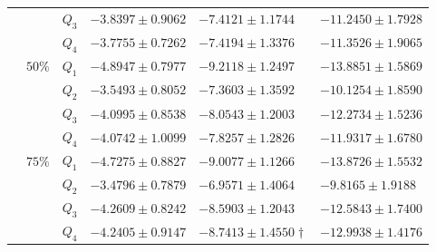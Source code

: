 \begin{table}[h]
{\begin{tabular}{@{}ccclll@{}}
 &  & $Q_{3}$ & $-3.8397 \pm 0.9062$ & $-7.4121 \pm 1.1744$ & $-11.2450 \pm 1.7928$ \\
 &  & $Q_{4}$ & $-3.7755 \pm 0.7262$ & $-7.4194 \pm 1.3376$ & $-11.3526 \pm 1.9065$ \\ \cmidrule(l){2-6} 
 & $50\%$ & $Q_{1}$ & $-4.8947 \pm 0.7977$ & $-9.2118 \pm 1.2497$ & $-13.8851 \pm 1.5869$ \\
 &  & $Q_{2}$ & $\mathbf{-3.5493 \pm 0.8052}$ & $\mathbf{-7.3603 \pm 1.3592}$ & $\mathbf{-10.1254 \pm 1.8590}$ \\
 &  & $Q_{3}$ & $-4.0995 \pm 0.8538$ & $-8.0543 \pm 1.2003$ & $-12.2734 \pm 1.5236$ \\
 &  & $Q_{4}$ & $-4.0742 \pm 1.0099$ & $-7.8257 \pm 1.2826$ & $-11.9317 \pm 1.6780$ \\ \cmidrule(l){2-6} 
 & $75\%$ & $Q_{1}$ & $-4.7275 \pm 0.8827$ & $-9.0077 \pm 1.1266$ & $-13.8726 \pm 1.5532$ \\
 &  & $Q_{2}$ & $\mathbf{-3.4796 \pm 0.7879}$ & $\mathbf{-6.9571 \pm 1.4064}$ & $\mathbf{-9.8165 \pm 1.9188}$ \\
 &  & $Q_{3}$ & $-4.2609 \pm 0.8242$ & $-8.5903 \pm 1.2043$ & $-12.5843 \pm 1.7400$ \\
 &  & $Q_{4}$ & $-4.2405 \pm 0.9147$ & $-8.7413 \pm 1.4550\dagger$ & $-12.9938 \pm 1.4176$ \\ \bottomrule
\end{tabular}%
}
\end{table}


